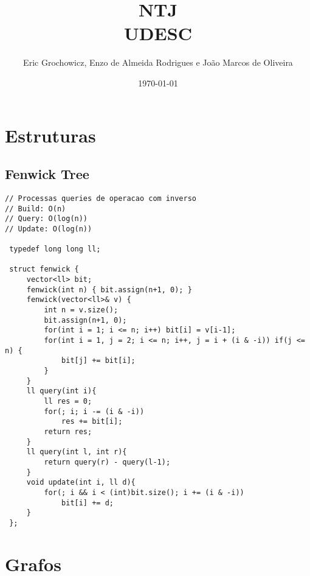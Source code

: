 \documentclass[11pt, a4paper, twoside]{article}
\title{NTJ \\ UDESC}
\author{Eric Grochowicz, Enzo de Almeida Rodrigues e João Marcos de Oliveira}
\begin{document}
\twocolumn
\date{\today}
\maketitle


\renewcommand{\contentsname}{Índice} %
\tableofcontents
\clearpage


%
%

\section{Estruturas}

\subsection{Fenwick Tree}
\begin{lstlisting}
// Processas queries de operacao com inverso
// Build: O(n)
// Query: O(log(n))
// Update: O(log(n))

 typedef long long ll;
 
 struct fenwick {
     vector<ll> bit;
     fenwick(int n) { bit.assign(n+1, 0); }
     fenwick(vector<ll>& v) {
         int n = v.size();
         bit.assign(n+1, 0);
         for(int i = 1; i <= n; i++) bit[i] = v[i-1];
         for(int i = 1, j = 2; i <= n; i++, j = i + (i & -i)) if(j <= n) {
             bit[j] += bit[i];
         }
     }
     ll query(int i){
         ll res = 0;
         for(; i; i -= (i & -i))
             res += bit[i];
         return res;
     }
     ll query(int l, int r){
         return query(r) - query(l-1);
     }
     void update(int i, ll d){
         for(; i && i < (int)bit.size(); i += (i & -i))
             bit[i] += d;
     }
 };
\end{lstlisting}

\clearpage


%
%

\section{Grafos}
\end{document}
